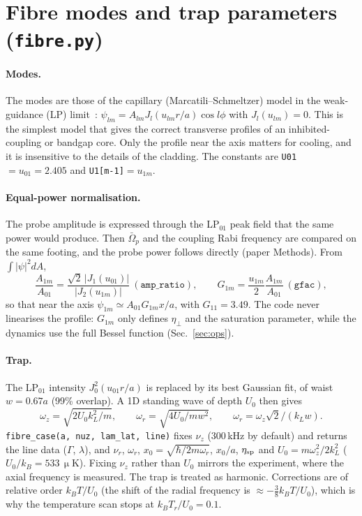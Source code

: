 \documentclass[11pt,a4paper]{article}
\newcommand{\Om}{\Omega}
\newcommand{\etap}{\eta_\perp}
\newcommand{\code}[1]{\texttt{#1}}
\newcommand{\SI}[2]{\ensuremath{#1\,\mathrm{#2}}}
\begin{document}
\section{Fibre modes and trap parameters (\code{fibre.py})}
\label{sec:fibre}
\paragraph{Modes.} The modes are those of the capillary (Marcatili--Schmeltzer) model in the weak-guidance (LP) limit~\cite{marcatili1964,snyder1983}: $\psi_{lm}=A_{lm}J_l(u_{lm}r/a)\cos l\phi$ with $J_l(u_{lm})=0$. This is the simplest model that gives the correct transverse profiles of an inhibited-coupling or bandgap core. Only the profile near the axis matters for cooling, and it is insensitive to the details of the cladding. The constants are \code{U01}$=u_{01}=2.405$ and \code{U1[m-1]}$=u_{1m}$.

\paragraph{Equal-power normalisation.} The probe amplitude is expressed through the LP$_{01}$ peak field that the same power would produce. Then $\bar\Om_p$ and the coupling Rabi frequency are compared on the same footing, and the probe power follows directly (paper Methods). From $\int|\psi|^2dA$,
\begin{equation}
  \frac{A_{1m}}{A_{01}}=\frac{\sqrt2\,|J_1(u_{01})|}{|J_2(u_{1m})|}\ (\code{amp\_ratio}),\qquad
  G_{1m}=\frac{u_{1m}}2\frac{A_{1m}}{A_{01}}\ (\code{gfac}),
\end{equation}
so that near the axis $\psi_{1m}\simeq A_{01}G_{1m}x/a$, with $G_{11}=3.49$. The code never linearises the profile: $G_{1m}$ only defines $\etap$ and the saturation parameter, while the dynamics use the full Bessel function (Sec.~\ref{sec:ops}).

\paragraph{Trap.} The LP$_{01}$ intensity $J_0^2(u_{01}r/a)$ is replaced by its best Gaussian fit, of waist $w=0.67a$ (99\% overlap). A 1D standing wave of depth $U_0$ then gives
\begin{equation}
  \omega_z=\sqrt{2U_0k_L^2/m},\qquad \omega_r=\sqrt{4U_0/mw^2},\qquad \omega_r=\omega_z\sqrt2/(k_Lw).
\end{equation}
\code{fibre\_case(a, nuz, lam\_lat, line)} fixes $\nu_z$ (300\,kHz by default) and returns the line data ($\Gamma$, $\lambda$), and $\nu_r$, $\omega_r$, $x_0=\sqrt{\hbar/2m\omega_r}$, $x_0/a$, $\eta_{\rm sp}$ and $U_0=m\omega_z^2/2k_L^2$ ($U_0/k_B=\SI{533}{\upmu K}$). Fixing $\nu_z$ rather than $U_0$ mirrors the experiment, where the axial frequency is measured. The trap is treated as harmonic. Corrections are of relative order $k_BT/U_0$ (the shift of the radial frequency is $\approx-\tfrac38k_BT/U_0$), which is why the temperature scan stops at $k_BT_r/U_0=0.1$.
\end{document}
